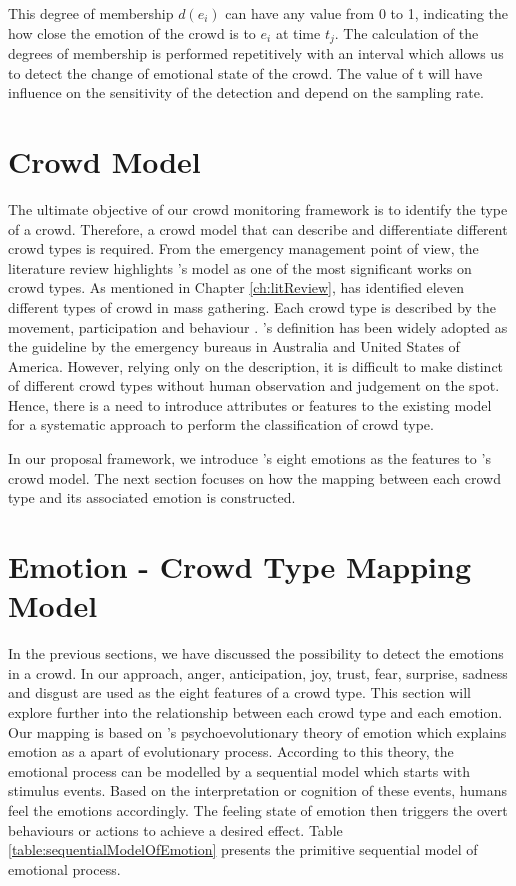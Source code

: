 This degree of membership \(d(e_i)\) can have any value from 0 to 1, indicating the how close the emotion of the crowd is to \(e_i\) at time \(t_j\). The calculation of the degrees of membership is performed repetitively with an interval which allows us to detect the change of emotional state of the crowd. The value of t will have influence on the sensitivity of the detection and depend on the sampling rate.

\section{Crowd Model}

The ultimate objective of our crowd monitoring framework is to identify the type of a crowd. Therefore, a crowd model that can describe and differentiate different crowd types is required. From the emergency management point of view, the literature review highlights \citet{Berlonghi1995}'s model as one of the most significant works on crowd types. As mentioned in Chapter \ref{ch:litReview}, \citet{Berlonghi1995} has identified eleven different types of crowd in mass gathering. Each crowd type is described by the movement, participation and behaviour \citep{Zeitz2009}. \citet{Berlonghi1995}'s definition has been widely adopted as the guideline by the emergency bureaus in Australia and United States of America. However, relying only on the description, it is difficult to make distinct of different crowd types without human observation and judgement on the spot. Hence, there is a need to introduce attributes or features to the existing model for a systematic approach to perform the classification of crowd type.

In our proposal framework, we introduce \citet{Plutchik1980}'s eight emotions as the features to \citet{Berlonghi1995}'s crowd model. The next section focuses on how the mapping between each crowd type and its associated emotion is constructed.

\section{Emotion - Crowd Type Mapping Model}
In the previous sections, we have discussed the possibility to detect the emotions in a crowd. In our approach, anger, anticipation, joy, trust, fear, surprise, sadness and disgust are used as the eight features of a crowd type. This section will explore further into the relationship between each crowd type and each emotion. Our mapping is based on \citet{Plutchik1980}'s psychoevolutionary theory of emotion which explains emotion as a apart of evolutionary process. According to this theory, the emotional process can be modelled by a sequential model which starts with stimulus events. Based on the interpretation or cognition of these events, humans feel the emotions accordingly. The feeling state of emotion then triggers the overt behaviours or actions to achieve a desired effect. Table \ref{table:sequentialModelOfEmotion} presents the primitive sequential model of emotional process.

